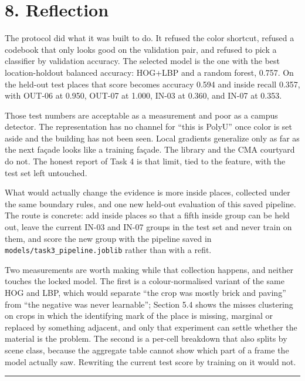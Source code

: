 \documentclass[11pt,a4paper]{article}
\begin{document}
\section{8. Reflection}\label{reflection}

The protocol did what it was built to do. It refused the color shortcut, refused a codebook that only looks good on the validation pair, and refused to pick a classifier by validation accuracy. The selected model is the one with the best location-holdout balanced accuracy: HOG+LBP and a random forest, 0.757. On the held-out test places that score becomes accuracy 0.594 and inside recall 0.357, with OUT-06 at 0.950, OUT-07 at 1.000, IN-03 at 0.360, and IN-07 at 0.353.

Those test numbers are acceptable as a measurement and poor as a campus detector. The representation has no channel for ``this is PolyU'' once color is set aside and the building has not been seen. Local gradients generalize only as far as the next façade looks like a training façade. The library and the CMA courtyard do not. The honest report of Task 4 is that limit, tied to the feature, with the test set left untouched.

What would actually change the evidence is more inside places, collected under the same boundary rules, and one new held-out evaluation of this saved pipeline. The route is concrete: add inside places so that a fifth inside group can be held out, leave the current IN-03 and IN-07 groups in the test set and never train on them, and score the new group with the pipeline saved in \texttt{models/\allowbreak{}task3\_\allowbreak{}pipeline.joblib} rather than with a refit.

Two measurements are worth making while that collection happens, and neither touches the locked model. The first is a colour-normalised variant of the same HOG and LBP, which would separate ``the crop was mostly brick and paving'' from ``the negative was never learnable''; Section 5.4 shows the misses clustering on crops in which the identifying mark of the place is missing, marginal or replaced by something adjacent, and only that experiment can settle whether the material is the problem. The second is a per-cell breakdown that also splits by scene class, because the aggregate table cannot show which part of a frame the model actually saw. Rewriting the current test score by training on it would not.

\begin{center}\rule{0.5\linewidth}{0.5pt}\end{center}
\end{document}
